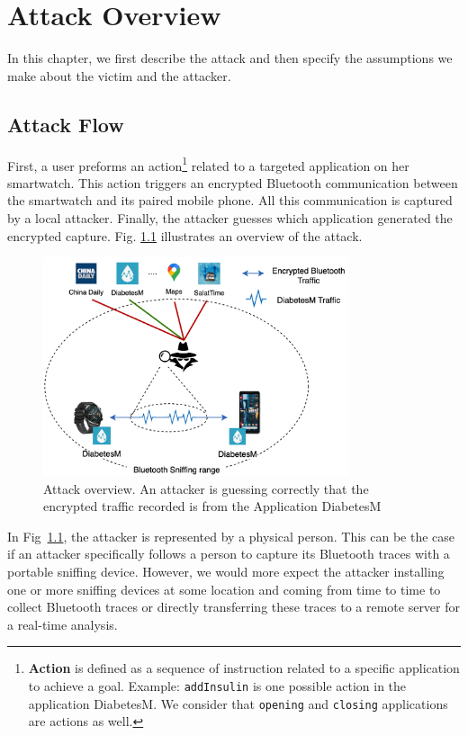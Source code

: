 \chapter{Attack Overview}
\label{chap:attack overview}
In this chapter, we first describe the attack and then specify the assumptions we make about the victim and the attacker.

\section{Attack Flow} First, a user preforms an action\footnote{\textbf{Action} is defined as a sequence of instruction related to a specific application to achieve a goal. Example: \texttt{addInsulin} is one possible action in the application DiabetesM. We consider that \texttt{opening} and \texttt{closing} applications are actions as well.} related to a targeted application on her smartwatch. This action triggers an encrypted Bluetooth communication between the smartwatch and its paired mobile phone. All this communication is captured by a local attacker. Finally, the attacker guesses which application generated the encrypted capture. Fig. \ref{fig:attack_overview} illustrates an overview of the attack.


\begin{figure}[H]
 \centering
 \includegraphics[width=0.8\textwidth]{figures/attack_overview.png}
 \caption[test]{Attack overview. An attacker is guessing correctly that the encrypted traffic recorded is from the Application DiabetesM\footnotemark}
 \label{fig:attack_overview}
\end{figure}


In Fig~\ref{fig:attack_overview}, the attacker is represented by a physical person. This can be the case if an attacker specifically follows a person to capture its Bluetooth traces with a portable sniffing device. However, we would more expect the attacker installing one or more sniffing devices at some location and coming from time to time to collect Bluetooth traces or directly transferring these traces to a remote server for a real-time analysis. 


